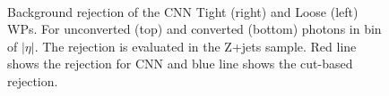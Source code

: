 \begin{figure}[ht]
    \centering
	 \\
    \caption{Background rejection of the CNN Tight (right) and Loose (left) WPs. For unconverted (top) and converted (bottom) photons in bin of $|\eta|$. The rejection is evaluated in the Z+jets sample. Red line shows the rejection for CNN and blue line shows the cut-based rejection.}
    \label{BkgRej}
\end{figure}

